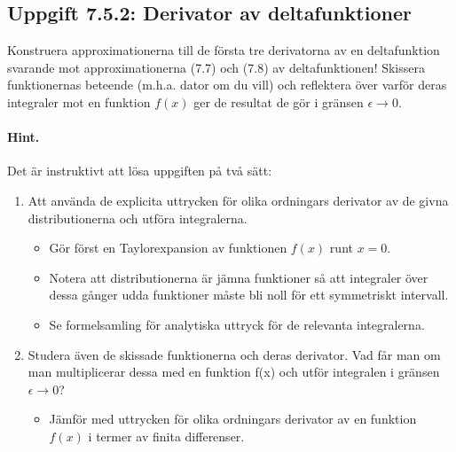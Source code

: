 \documentclass[%
oneside,                 %
final,                   %
10pt]{article}
\newenvironment{doconceexercise}{}{}
\newcounter{doconceexercisecounter}
\begin{document}
\begin{doconceexercise}

\subsection*{Uppgift 7.5.2: Derivator av deltafunktioner}

Konstruera approximationerna till de första tre derivatorna av en deltafunktion svarande mot approximationerna (7.7) och (7.8) av deltafunktionen! Skissera funktionernas beteende (m.h.a. dator om du vill) och reflektera över varför deras integraler 
mot en funktion $f(x)$ ger de resultat de gör i gränsen $\epsilon \rightarrow 0$.


\paragraph{Hint.}
Det är instruktivt att lösa uppgiften på två sätt:
\begin{enumerate}
\item Att använda de explicita uttrycken för olika ordningars derivator av de givna distributionerna och utföra integralerna. 
\begin{itemize}

  \item Gör först en Taylorexpansion av funktionen $f(x)$ runt $x=0$.

  \item Notera att distributionerna är jämna funktioner så att integraler över dessa gånger udda funktioner måste bli noll för ett symmetriskt intervall.

  \item Se formelsamling för analytiska uttryck för de relevanta integralerna.

\end{itemize}

\noindent
\item Studera även de skissade funktionerna och deras derivator. Vad får man om man multiplicerar dessa med en funktion f(x) och utför integralen i gränsen $\epsilon \to 0$?
\begin{itemize}

  \item Jämför med uttrycken för olika ordningars derivator av en funktion $f(x)$ i termer av finita differenser.
\end{itemize}


\end{enumerate}
\end{doconceexercise}
\end{document}
